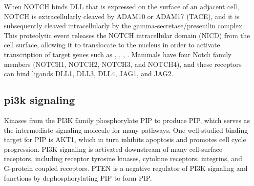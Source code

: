 		When NOTCH binds DLL that is expressed on the surface of an adjacent cell, NOTCH is extracellularly cleaved by ADAM10 or ADAM17 (TACE), and it is subsequently cleaved intracellularly by the gamma-secretase/presenilin complex. This proteolytic event releases the NOTCH intracellular domain (NICD) from the cell surface, allowing it to translocate to the nucleus in order to activate transcription of target genes such as , , , . Mammals have four Notch family members (NOTCH1, NOTCH2, NOTCH3, and NOTCH4), and these receptors can bind ligands DLL1, DLL3, DLL4, JAG1, and JAG2. 


\subsection{\gls{pi3k} signaling}

		Kinases from the PI3K family phosphorylate PIP to produce PIP, which serves as the intermediate signaling molecule for many pathways. One well-studied binding target for PIP is AKT1, which in turn inhibits apoptosis and promotes cell cycle progression. PI3K signaling is activated downstream of many cell-surface receptors, including receptor tyrosine kinases, cytokine receptors, integrins, and G-protein coupled receptors.
		PTEN is a negative regulator of PI3K signaling and functions by dephosphorylating PIP to form PIP. 


